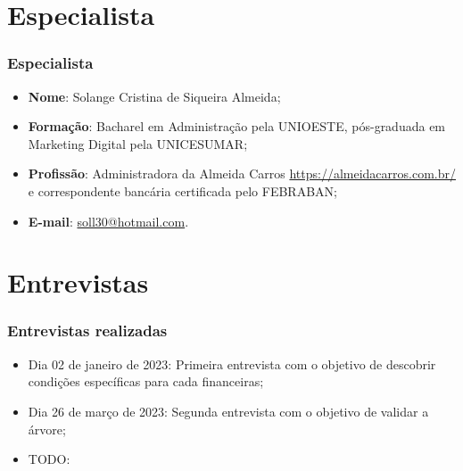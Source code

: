 \documentclass[12pt]{beamer}
\begin{document}
\section{Especialista}
\begin{frame}
    \frametitle{Especialista}
    \begin{itemize}
        \item\textbf{Nome}: Solange Cristina de Siqueira Almeida;
        \item\textbf{Formação}: Bacharel em Administração pela UNIOESTE, pós-graduada em Marketing Digital pela UNICESUMAR\@;
        \item\textbf{Profissão}: Administradora da Almeida Carros \url{https://almeidacarros.com.br/} e correspondente bancária certificada pelo FEBRABAN\@;
        \item\textbf{E-mail}: \url{soll30@hotmail.com}.
    \end{itemize}
\end{frame}

\section{Entrevistas}
\begin{frame}
    \frametitle{Entrevistas realizadas}

    \begin{itemize}
        \item Dia 02 de janeiro de 2023: Primeira entrevista com o objetivo de descobrir condições específicas para cada financeiras;
        \item Dia 26 de março de 2023: Segunda entrevista com o objetivo de validar a árvore;
        \item TODO:
    \end{itemize}

\end{frame}
\end{document}
